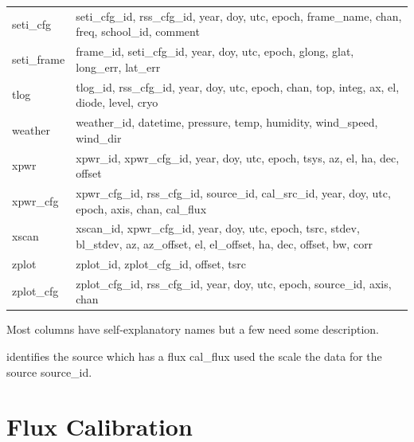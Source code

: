 \documentclass[letterpaper,11pt]{report}
\begin{document}
\begin{table}[h!tb]
\begin{center}
\begin{tabular}{l|p{4in}}
        {\ttfamily seti\_cfg}      & seti\_cfg\_id, rss\_cfg\_id, year, doy,
                                     utc, epoch, frame\_name, chan, freq, 
                                     school\_id, comment\\
        {\ttfamily seti\_frame}    & frame\_id, seti\_cfg\_id, year, doy, utc,
                                     epoch, glong, glat, long\_err, lat\_err \\
        {\ttfamily tlog}           & tlog\_id, rss\_cfg\_id, year, doy, utc,
                                     epoch, chan, top, integ, ax, el, diode, 
                                     level, cryo \\
        {\ttfamily weather}        & weather\_id, datetime, pressure, temp, 
                                     humidity, wind\_speed, wind\_dir \\
        {\ttfamily xpwr}           & xpwr\_id, xpwr\_cfg\_id, year, doy, utc, 
                                     epoch, tsys, az, el, ha, dec, offset \\
        {\ttfamily xpwr\_cfg}      & xpwr\_cfg\_id, rss\_cfg\_id, source\_id, 
                                     cal\_src\_id, year, doy, utc, epoch, axis, 
                                     chan, cal\_flux \\
        {\ttfamily xscan}          & xscan\_id, xpwr\_cfg\_id, year, doy, utc, epoch, 
                                     tsrc, stdev, bl\_stdev, az, az\_offset, el,
                                     el\_offset, ha, dec, offset, bw, corr \\
        {\ttfamily zplot}          & zplot\_id, zplot\_cfg\_id, offset, tsrc \\
        {\ttfamily zplot\_cfg}     & zplot\_cfg\_id, rss\_cfg\_id, year, doy,
                                     utc, epoch, source\_id, axis, chan \\
        \hline
    \end{tabular}
\end{center}
\end{table}
Most columns have self-explanatory names but a few need some description.
\begin{description}\itemsep0pt \parskip0pt 
    \item[\ttfamily cal\_src\_id] identifies the source which has a flux
        {\ttfamily cal\_flux} used the scale the data for the source
        {\ttfamily source\_id}.
\end{description}


\chapter{Flux Calibration}
\end{document}

